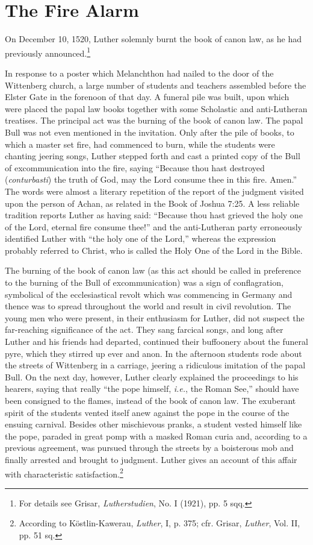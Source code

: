 \section{The Fire Alarm}

On December 10, 1520, Luther solemnly burnt the book of canon
law, as he had previously announced.\footnote
{For details see Grisar, \textit{Lutherstudien}, No. I (1921), pp. 5 sqq.}

In response to a poster which Melanchthon had nailed to the door
of the Wittenberg church, a large number of students and teachers
assembled before the Elster Gate in the forenoon of that day. A
funeral pile was built, upon which were placed the papal law books
together with some Scholastic and anti-Lutheran treatises. The principal
act was the burning of the book of canon law. The papal Bull
was not even mentioned in the invitation. Only after the pile of
books, to which a master set fire, had commenced to burn, while
the students were chanting jeering songs, Luther stepped forth and
cast a printed copy of the Bull of excommunication into the fire, saying
“Because thou hast destroyed (\textit{conturbasti}) the truth of God,
may the Lord consume thee in this fire. Amen.” The words were
almost a literary repetition of the report of the judgment visited upon
the person of Achan, as related in the Book of Joshua 7:25. A
less reliable tradition reports Luther as having said: “Because thou
hast grieved the holy one of the Lord, eternal fire consume thee!”
and the anti-Lutheran party erroneously identified Luther with “the
holy one of the Lord,” whereas the expression probably referred to
Christ, who is called the Holy One of the Lord in the Bible.

The burning of the book of canon law (as this act should be called
in preference to the burning of the Bull of excommunication) was a
sign of conflagration, symbolical of the ecclesiastical revolt which
was commencing in Germany and thence was to spread throughout
the world and result in civil revolution. The young men who were
present, in their enthusiasm for Luther, did not suspect the far-reaching
significance of the act. They sang farcical songs, and long
after Luther and his friends had departed, continued their buffoonery
about the funeral pyre, which they stirred up ever and anon. In the
afternoon students rode about the streets of Wittenberg in a carriage,
jeering a ridiculous imitation of the papal Bull. On the next day,
however, Luther clearly explained the proceedings to his hearers, saying
that really “the pope himself, \textit{i.e.}, the Roman See,” should have
been consigned to the flames, instead of the book of canon law. The
exuberant spirit of the students vented itself anew against the pope in
the course of the ensuing carnival. Besides other mischievous pranks, a
student vested himself like the pope, paraded in great pomp with a
masked Roman curia and, according to a previous agreement, was pursued
through the streets by a boisterous mob and finally arrested and
brought to judgment. Luther gives an account of this affair with
characteristic satisfaction.\footnote
{According to Köstlin-Kawerau, \textit{Luther}, I, p. 375; cfr. Grisar, \textit{Luther}, Vol. II, pp.
51 sq.}


